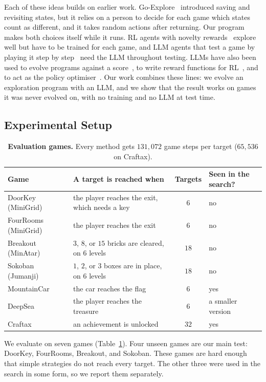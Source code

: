\documentclass{article}
\begin{document}
Each of these ideas builds on earlier work. Go-Explore~\citep{goexplore} introduced saving and revisiting states, but it
relies on a person to decide for each game which states count as different, and it takes random actions after
returning. Our program makes both choices itself while it runs. RL agents with novelty
rewards~\citep{tang2017,rnd,icm} explore well but have to be trained for each game, and LLM agents that test a game by
playing it step by step~\citep{titan} need the LLM throughout testing. LLMs have also been used to evolve programs
against a score~\citep{funsearch,shinkaevolve}, to write reward functions for RL~\citep{eureka}, and to act as the
policy optimiser~\citep{promptpo}. Our work combines these lines: we evolve an exploration program with an LLM, and we
show that the result works on games it was never evolved on, with no training and no LLM at test time.

\subsection{Experimental Setup}
\label{sec:protocol}
\begin{table}[t]\centering\small
\caption{\textbf{Evaluation games.} Every method gets $131{,}072$ game steps per target ($65{,}536$ on Craftax).}
\label{tab:protocol}
\setlength{\tabcolsep}{5pt}
\begin{tabular}{@{}llcl@{}}\toprule
Game & A target is reached when & Targets & Seen in the search? \\ \midrule
DoorKey (MiniGrid) & the player reaches the exit, which needs a key & $6$ & no \\
FourRooms (MiniGrid) & the player reaches the exit & $6$ & no \\
Breakout (MinAtar) & $3$, $8$, or $15$ bricks are cleared, on $6$ levels & $18$ & no \\
Sokoban (Jumanji) & $1$, $2$, or $3$ boxes are in place, on $6$ levels & $18$ & no \\ \midrule
MountainCar & the car reaches the flag & $6$ & yes \\
DeepSea & the player reaches the treasure & $6$ & a smaller version \\
Craftax & an achievement is unlocked & $32$ & yes \\ \bottomrule
\end{tabular}
\end{table}

We evaluate on seven games (Table~\ref{tab:protocol}). Four unseen games are our main test: DoorKey, FourRooms, Breakout, and Sokoban. These games are hard enough that simple strategies do not reach every target. The other three were used in the search in some form, so we report them separately.
\end{document}
